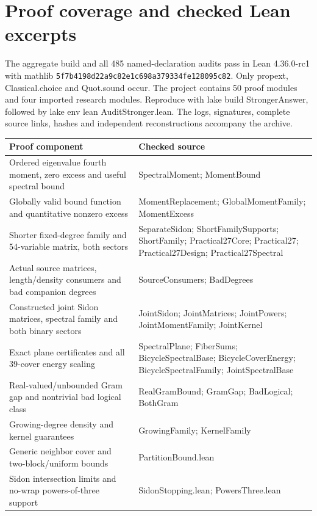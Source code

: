\clearpage\section{Proof coverage and checked Lean excerpts}\label{app:proofs}
The aggregate build and all 485 named-declaration audits pass in Lean 4.36.0-rc1 with mathlib \nolinkurl{5f7b4198d22a9c82e1c698a379334fe128095c82}. Only propext, Classical.choice and Quot.sound occur. The project contains 50 proof modules and four imported research modules. Reproduce with lake build StrongerAnswer, followed by lake env lean AuditStronger.lean. The logs, signatures, complete source links, hashes and independent reconstructions accompany the archive.

\begin{longtable}{@{}>{\raggedright\arraybackslash}p{.465\linewidth}>{\raggedright\arraybackslash}p{.465\linewidth}@{}}
\toprule
\textbf{Proof component} & \textbf{Checked source}\\\midrule\endhead
Ordered eigenvalue fourth moment, zero excess and useful spectral bound & SpectralMoment; MomentBound\\[4pt]
Globally valid bound function and quantitative nonzero excess & MomentReplacement; GlobalMomentFamily; MomentExcess\\[4pt]
Shorter fixed-degree family and 54-variable matrix, both sectors & SeparateSidon; ShortFamilySupports; ShortFamily; Practical27Core; Practical27; Practical27Design; Practical27Spectral\\[4pt]
Actual source matrices, length/density consumers and bad companion degrees & SourceConsumers; BadDegrees\\[4pt]
Constructed joint Sidon matrices, spectral family and both binary sectors & JointSidon; JointMatrices; JointPowers; JointMomentFamily; JointKernel\\[4pt]
Exact plane certificates and all 39-cover energy scaling & SpectralPlane; FiberSums; BicycleSpectralBase; BicycleCoverEnergy; BicycleSpectralFamily; JointSpectralBase\\[4pt]
Real-valued/unbounded Gram gap and nontrivial bad logical class & RealGramBound; GramGap; BadLogical; BothGram\\[4pt]
Growing-degree density and kernel guarantees & GrowingFamily; KernelFamily\\[4pt]
Generic neighbor cover and two-block/uniform bounds & PartitionBound.lean\\[4pt]
Sidon intersection limits and no-wrap powers-of-three support & SidonStopping.lean; PowersThree.lean\\[4pt]

\end{longtable}
